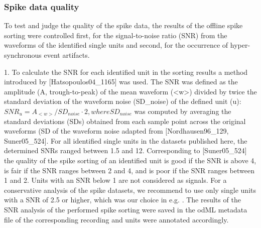 {\subsubsection{Spike data quality}

To test and judge the quality of the spike data, the results of the offline spike sorting were controlled first, for the signal-to-noise ratio (SNR) from the waveforms of the identified single units and second, for the occurrence of hyper-synchronous event artifacts.

1. To calculate the SNR for each identified unit in the sorting results a method introduced by [Hatsopoulos04\_1165] was used. The SNR was defined as the amplitude (A, trough-to-peak) of the mean waveform (<w>) divided by twice the standard deviation of the waveform noise (SD\_{noise}) of the defined unit (u): $SNR_{u}=A_{<w>}/SD_{noise}\cdot2,where SD_{noise}$ was computed by averaging the standard deviations (SDs) obtained from each sample point across the original waveforms (SD of the waveform noise adapted from [Nordhausen96\_129, Suner05\_524]. For all identified single units in the datasets published here, the determined SNRs ranged between 1.5 and 12. Corresponding to [Suner05\_524] the quality of the spike sorting of an identified unit is good if the SNR is above 4, is fair if the SNR ranges between 2 and 4, and is poor if the SNR ranges between 1 and 2. Units with an SNR below 1 are not considered as signals. For a conservative analysis of the spike datasets, we recommend to use only single units with a SNR of 2.5 or higher, which was our choice in e.g. . The results of the SNR analysis of the performed spike sorting were saved in the odML metadata file of the corresponding recording and units were annotated accordingly. 

}
